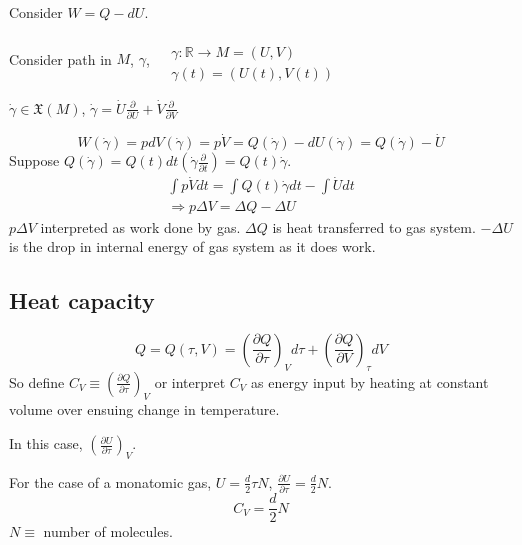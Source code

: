 \documentclass[10pt]{amsart}
\begin{document}
\begin{multicols*}{2}
Consider $W = Q-dU$.  

Consider path in $M$, $\gamma$, $\begin{aligned} & \quad \\
  & \gamma : \mathbb{R} \to M = (U,V) \\
  & \gamma(t) = (U(t), V(t)) \end{aligned}$

$\dot{\gamma} \in \mathfrak{X}(M)$, $\dot{\gamma} = \dot{U} \frac{\partial }{ \partial U} + \dot{V} \frac{ \partial }{ \partial V}$

\[
W(\dot{\gamma}) = pdV(\dot{\gamma}) = p\dot{V} = Q(\dot{\gamma}) - dU(\dot{\gamma}) = Q(\dot{\gamma}) - \dot{U}
\]
Suppose $Q(\dot{\gamma}) = Q(t)dt(\dot{\gamma} \frac{ \partial }{ \partial t} ) = Q(t) \dot{\gamma}$.  
\[
\begin{gathered}
  \int p \dot{V} dt = \int Q(t) \dot{\gamma}dt - \int \dot{U}dt \\ 
  \Longrightarrow p\Delta V = \Delta Q - \Delta U
\end{gathered}
\]
$p\Delta V$ interpreted as work done by gas. $\Delta Q$ is heat transferred to gas system.  $-\Delta U$ is the drop in internal energy of gas system as it does work.  

\subsection{Heat capacity}

\[
Q = Q(\tau,V) = \left( \frac{ \partial Q}{ \partial \tau} \right)_V d\tau +  \left( \frac{ \partial Q}{ \partial V} \right)_{\tau} dV
\]
So define $C_V \equiv \left( \frac{ \partial Q}{ \partial \tau} \right)_V$ or interpret $C_V$ as energy input by heating at constant volume over ensuing change in temperature.  

In this case, $\left( \frac{ \partial U}{ \partial \tau } \right)_V$.  

For the case of a monatomic gas, $U =\frac{d}{2} \tau N$, $\frac{ \partial U}{ \partial \tau} = \frac{d}{2} N$.  
\[
C_V = \frac{d}{2} N
\]
$N \equiv $ number of molecules.  


\end{multicols*}
\end{document}
